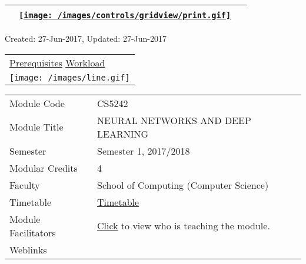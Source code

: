 \hypertarget{ctl00_ctl00_ContentPlaceHolder1_ContentPlaceHolder1_UP}{}
\hypertarget{contentstart}{}
\hypertarget{ctl00_ctl00_ContentPlaceHolder1_ContentPlaceHolder1_pnlMain}{}
\begin{longtable}[]{@{}ll@{}}
\toprule
&
{\href{javascript:PrintThisPage();}{\texttt{[image: /images/controls/gridview/print.gif]}}~~}\tabularnewline
\bottomrule
\end{longtable}

\protect\hypertarget{ctl00_ctl00_ContentPlaceHolder1_ContentPlaceHolder1_LV_UpdateInfo_ctrl0_txtDate}{}{Created:
27-Jun-2017, Updated: 27-Jun-2017}

\begin{longtable}[]{@{}l@{}}
\toprule
\protect\hypertarget{ctl00_ctl00_ContentPlaceHolder1_ContentPlaceHolder1_lblSectionTop}{}{\protect\hyperlink{Prerequisites}{Prerequisites}
\textbar{} \protect\hyperlink{Workload}{Workload}}\tabularnewline
\texttt{[image: /images/line.gif]}\tabularnewline
\bottomrule
\end{longtable}

\hypertarget{ctl00_ctl00_ContentPlaceHolder1_ContentPlaceHolder1_LV_itemPlaceholderContainer}{}
\begin{longtable}[]{@{}ll@{}}
\toprule
\protect\hypertarget{ctl00_ctl00_ContentPlaceHolder1_ContentPlaceHolder1_LV_ctrl0_txtCode}{}{Module
Code} &
\protect\hypertarget{ctl00_ctl00_ContentPlaceHolder1_ContentPlaceHolder1_LV_ctrl0_lcCode}{}{CS5242}\tabularnewline
\protect\hypertarget{ctl00_ctl00_ContentPlaceHolder1_ContentPlaceHolder1_LV_ctrl0_lcCourse}{}{Module
Title} &
\protect\hypertarget{ctl00_ctl00_ContentPlaceHolder1_ContentPlaceHolder1_LV_ctrl0_lcCourseName}{}{NEURAL
NETWORKS AND DEEP LEARNING}\tabularnewline
\protect\hypertarget{ctl00_ctl00_ContentPlaceHolder1_ContentPlaceHolder1_LV_ctrl0_lcSemester}{}{Semester}
&
\protect\hypertarget{ctl00_ctl00_ContentPlaceHolder1_ContentPlaceHolder1_LV_ctrl0_lcSem}{}{Semester
1, 2017/2018}\tabularnewline
\protect\hypertarget{ctl00_ctl00_ContentPlaceHolder1_ContentPlaceHolder1_LV_ctrl0_lcModCredit}{}{Modular
Credits} &
\protect\hypertarget{ctl00_ctl00_ContentPlaceHolder1_ContentPlaceHolder1_LV_ctrl0_lcModC}{}{4}\tabularnewline
\protect\hypertarget{ctl00_ctl00_ContentPlaceHolder1_ContentPlaceHolder1_LV_ctrl0_lcFaculty}{}{Faculty}
&
\protect\hypertarget{ctl00_ctl00_ContentPlaceHolder1_ContentPlaceHolder1_LV_ctrl0_lcFac}{}{School
of Computing (Computer Science)}\tabularnewline
\protect\hypertarget{ctl00_ctl00_ContentPlaceHolder1_ContentPlaceHolder1_LV_ctrl0_Label1}{}{Timetable}
&
\protect\hypertarget{ctl00_ctl00_ContentPlaceHolder1_ContentPlaceHolder1_LV_ctrl0_Span1}{}{\href{javascript:void(0);}{Timetable}}\tabularnewline
\protect\hypertarget{ctl00_ctl00_ContentPlaceHolder1_ContentPlaceHolder1_LV_ctrl0_Label6}{}{Module
Facilitators} &
\protect\hypertarget{ctl00_ctl00_ContentPlaceHolder1_ContentPlaceHolder1_LV_ctrl0_Span2}{}{\href{list_lecturers.aspx?CourseID=9cb3c728-e4c5-480b-a45a-51e1be843352\&ClickFrom=}{Click}
to view who is teaching the module.}\tabularnewline
\protect\hypertarget{ctl00_ctl00_ContentPlaceHolder1_ContentPlaceHolder1_LV_ctrl0_LabelCtrl1}{}{Weblinks}
&\tabularnewline
\bottomrule
\end{longtable}

